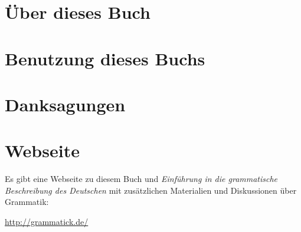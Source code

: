 

\section*{Über dieses Buch}
\label{sec:ueberdiesesbuch}

\section*{Benutzung dieses Buchs}
\label{sec:benutzungdiesesbuchs}

\section*{Danksagungen}
\label{sec:danksagungen}

\section*{Webseite}
\label{sec:webseite}

Es gibt eine Webseite zu diesem Buch und \textit{Einführung in die grammatische Beschreibung des Deutschen} mit zusätzlichen Materialien und Diskussionen über Grammatik:

\begin{center}
  \url{http://grammatick.de/}
\end{center}

